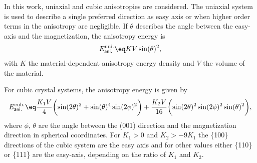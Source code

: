 \documentclass[\main/dresen_thesis.tex]{subfiles}
\begin{document}
        In this work, uniaxial and cubic anisotropies are considered.
        The uniaxial system is used to describe a single preferred direction as easy axis or when higher order terms in the anisotropy are negligible.
        If $\theta$ describes the angle between the easy-axis and the magnetization, the anisotropy energy is
        \begin{align}
          E_\mathsf{ani.}^\mathrm{uni.} \eq K V \sin(\theta)^2,
        \end{align}
        with $K$ the material-dependent anisotropy energy density and $V$ the volume of the material.

        For cubic crystal systems, the anisotropy energy is given by
        \begin{align}
          E_\mathsf{ani.}^\mathrm{cub.} \eq
            \frac{K_1 V}{4} \biggl(\sin(2 \theta)^2 + \sin(\theta)^4 \sin(2\phi)^2 \biggr) +
            \frac{K_2 V}{16} \biggl( \sin(2 \theta)^2 \sin(2 \phi)^2 \sin(\theta)^2 \biggr),
        \end{align}
        where $\phi, \, \theta$ are the angle between the (001) direction and the magnetization direction in spherical coordinates.
        For $K_1 > 0$ and $K_2 > -9 K_1$ the \{100\} directions of the cubic system are the easy axis and for other values either \{110\} or \{111\} are the easy-axis, depending on the ratio of $K_1$ and $K_2$.
\end{document}
